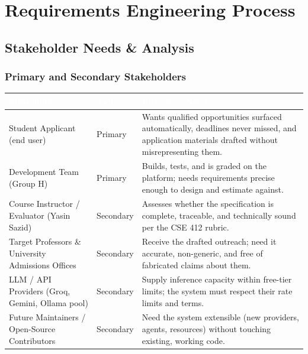 \documentclass[11pt,a4paper]{article}
\begin{document}
\section{Requirements Engineering Process}

\subsection{Stakeholder Needs \& Analysis}\label{sec:stakeholder-analysis}

\subsubsection{Primary and Secondary Stakeholders}
\renewcommand{\arraystretch}{1.3}
\begin{tabularx}{\linewidth}{|L{3.2cm}|C{1.9cm}|X|}
\hline
{}\textcolor{white}{\textbf{Stakeholder}} & \textcolor{white}{\textbf{Type}} & \textcolor{white}{\textbf{Interest / Need}} \\
\hline
Student Applicant (end user) & Primary & Wants qualified opportunities surfaced automatically, deadlines never missed, and application materials drafted without misrepresenting them. \\
Development Team (Group H) & Primary & Builds, tests, and is graded on the platform; needs requirements precise enough to design and estimate against. \\
Course Instructor / Evaluator (Yasin Sazid) & Secondary & Assesses whether the specification is complete, traceable, and technically sound per the CSE 412 rubric. \\
Target Professors \& University Admissions Offices & Secondary & Receive the drafted outreach; need it accurate, non-generic, and free of fabricated claims about them. \\
LLM / API Providers (Groq, Gemini, Ollama pool) & Secondary & Supply inference capacity within free-tier limits; the system must respect their rate limits and terms. \\
Future Maintainers / Open-Source Contributors & Secondary & Need the system extensible (new providers, agents, resources) without touching existing, working code. \\
\hline
\end{tabularx}
\end{document}
